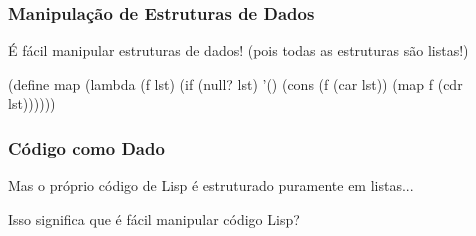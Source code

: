 
\begin{frame}[fragile]
  \frametitle{Manipulação de Estruturas de Dados}
  É fácil manipular estruturas de dados! (pois todas as estruturas são listas!)
  \vspace{0.5cm}
  \pause
  \begin{code}
  (define map
    (lambda (f lst)
      (if (null? lst)
          '()
          (cons (f (car lst))
                (map f (cdr lst))))))
  \end{code}
\end{frame}

\begin{frame}[fragile]
  \frametitle{Código como Dado}
  Mas o próprio código de Lisp é estruturado puramente em listas...
  \vspace{1cm} \pause

  Isso significa que é fácil manipular código Lisp?
\end{frame}
